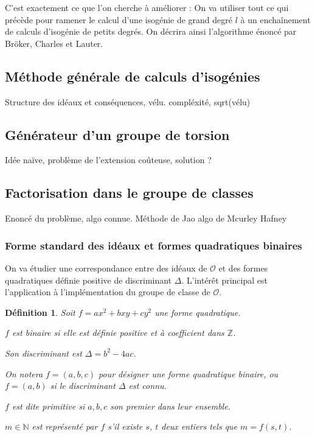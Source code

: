 \documentclass{article}
\newcommand{\N}[0]{\mathbb{N}}
\newcommand{\Z}[0]{\mathbb{Z}}
\newcommand{\OR}[0]{\mathcal{O}}
\newtheorem{Def}[The]{Définition}
\begin{document}
C'est exactement ce que l'on cherche à améliorer : On va utiliser tout ce qui précède pour ramener le calcul d'une isogénie de grand degré $l$ à un enchaînement de calculs d'isogénie de petits degrés. On décrira ainsi l’algorithme énoncé par Bröker, Charles et Lauter. 

\subsection{Méthode générale de calculs d'isogénies}
Structure des idéaux et conséquences, vélu. compléxité, sqrt(vélu)

\subsection{Générateur d'un groupe de torsion}
Idée naïve, problème de l'extension coûteuse, solution ?







\subsection{Factorisation dans le groupe de classes}
Enoncé du problème, algo connue. Méthode de Jao
algo de Mcurley Hafney

\subsubsection{Forme standard des idéaux et formes quadratiques binaires}

On va étudier une correspondance entre des idéaux de $\OR$ et des formes quadratiques définie positive de discriminant $\Delta$. L'intérêt principal est l'application à l’implémentation du groupe de classe de $\OR$. 

\begin{Def}
	Soit $f = ax^2 + bxy + cy^2$ une forme quadratique.
	
	$f$ est binaire si elle est définie positive et à coefficient dans $\Z$.
	
	Son discriminant est $\Delta = b^2 - 4ac$.
	
	On notera $f = (a,b,c)$ pour désigner une forme quadratique binaire,
	ou $f = (a,b)$ si le discriminant $\Delta$ est connu.  
	
	$f$ est dite primitive si $a,b,c$ son premier dans leur ensemble.
	
	$m\in\N$ est représenté par $f$ s'il existe $s$, $t$ deux entiers tels que $m = f(s,t)$.
\end{Def}
\end{document}
